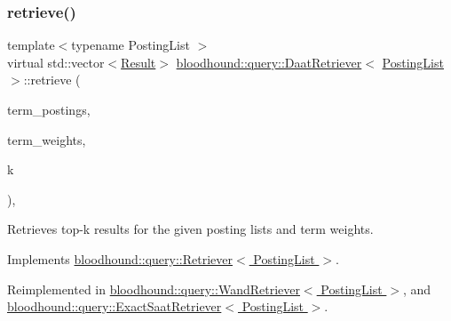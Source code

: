 \subsubsection{\texorpdfstring{retrieve()}{retrieve()}}
{\footnotesize\ttfamily template$<$typename Posting\+List $>$ \\
virtual std\+::vector$<$\hyperlink{structbloodhound_1_1query_1_1Result}{Result}$>$ \hyperlink{classbloodhound_1_1query_1_1DaatRetriever}{bloodhound\+::query\+::\+Daat\+Retriever}$<$ \hyperlink{classbloodhound_1_1PostingList}{Posting\+List} $>$\+::retrieve (\begin{DoxyParamCaption}\item[{const std\+::vector$<$ \hyperlink{classbloodhound_1_1PostingList}{Posting\+List} $>$ \&}]{term\+\_\+postings,  }\item[{const std\+::vector$<$ \hyperlink{structbloodhound_1_1Score}{Score} $>$ \&}]{term\+\_\+weights,  }\item[{std\+::size\+\_\+t}]{k }\end{DoxyParamCaption})\hspace{0.3cm}{\ttfamily [inline]}, {\ttfamily [virtual]}}



Retrieves top-\/k results for the given posting lists and term weights. 



Implements \hyperlink{classbloodhound_1_1query_1_1Retriever_ae3c6a4628c5580e620c213b3dcd47c2b}{bloodhound\+::query\+::\+Retriever$<$ Posting\+List $>$}.



Reimplemented in \hyperlink{classbloodhound_1_1query_1_1WandRetriever_a5f3068bc363c16c5b7255a925ea5af8c}{bloodhound\+::query\+::\+Wand\+Retriever$<$ Posting\+List $>$}, and \hyperlink{classbloodhound_1_1query_1_1ExactSaatRetriever_aced2763cc2a4c12838fef4a20759049e}{bloodhound\+::query\+::\+Exact\+Saat\+Retriever$<$ Posting\+List $>$}.

\mbox{\label{classbloodhound_1_1query_1_1DaatRetriever_a5b10288f90a4fc4d89f56971bdc48363}} 
